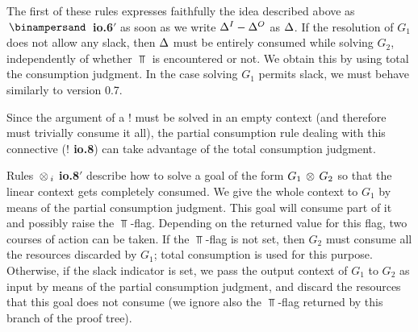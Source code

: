 The first of these rules expresses faithfully the idea described above as
{\bf $\With$ io.6$'$} as soon as we write $\Delta^I - \Delta^O$ as $\Delta$. If the
resolution of $G_1$ does not allow any slack, then $\Delta$ must be entirely
consumed while solving $G_2$, independently of whether $\Top$ is encountered
or not. We obtain this by using total the consumption judgment. In the
case solving $G_1$ permits slack, we must behave similarly to version 0.7.

Since the argument of a $!$ must be solved in an empty context (and therefore
must trivially consume it all), the partial consumption rule dealing with
this connective ({\bf $!$ io.8}) can take advantage of the total consumption
judgment.

Rules {\bf $\, \otimes \,_i$ io.8$'$} describe how to solve a goal of the form $G_1
\, \otimes \, G_2$ so that the linear context gets completely consumed. We give the
whole context to $G_1$ by means of the partial consumption judgment. This
goal will consume part of it and possibly raise the $\Top$-flag. Depending on
the returned value for this flag, two courses of action can be taken. If the
$\Top$-flag is not set, then $G_2$ must consume all the resources discarded
by $G_1$; total consumption is used for this purpose.  Otherwise, if the
slack indicator is set, we pass the output context of $G_1$ to $G_2$ as input
by means of the partial consumption judgment, and discard the resources that
this goal does not consume (we ignore also the $\Top$-flag returned by this
branch of the proof tree).




